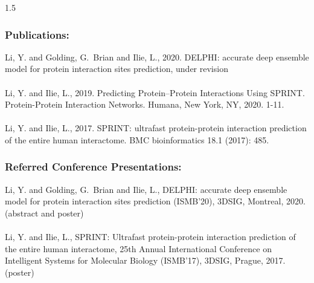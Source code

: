 \documentclass[12pt,twoside]{report}
\numberwithin{figure}{chapter}
\def\normalspacing{1.5} %
\begin{document}
\begin{spacing}{\normalspacing}
\subsubsection*{Publications:}
Li, Y. and Golding, G.~Brian and Ilie, L., 2020. DELPHI: accurate deep ensemble model for protein interaction sites prediction, under revision\\\\
Li, Y. and Ilie, L., 2019. Predicting Protein–Protein Interactions Using SPRINT. Protein-Protein Interaction Networks. Humana, New York, NY, 2020. 1-11.\\\\
Li, Y. and Ilie, L., 2017. SPRINT: ultrafast protein-protein interaction prediction of the entire human interactome. BMC bioinformatics 18.1 (2017): 485.

\subsubsection*{Referred Conference Presentations:}
Li, Y. and Golding, G.~Brian and Ilie, L., DELPHI: accurate deep ensemble model for protein interaction sites prediction
(ISMB’20), 3DSIG, Montreal, 2020. (abstract and poster)\\\\
Li, Y. and Ilie, L., SPRINT: Ultrafast protein-protein interaction prediction of the entire human interactome, 25th Annual International Conference on Intelligent Systems for Molecular Biology
(ISMB’17), 3DSIG, Prague, 2017. (poster)


\end{spacing}
\end{document}
